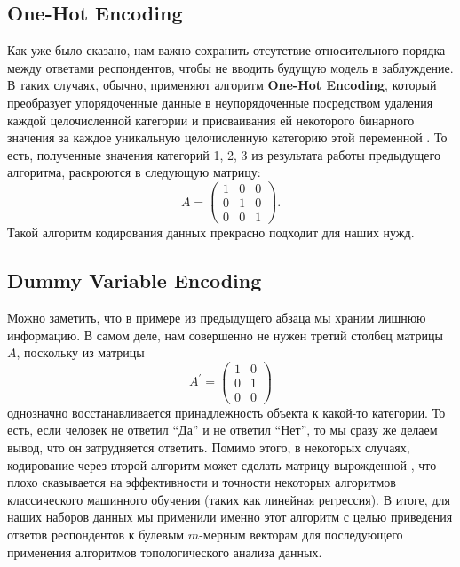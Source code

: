 \subsection{One-Hot Encoding}

Как уже было сказано, нам важно сохранить отсутствие относительного порядка между ответами респондентов, чтобы не вводить будущую модель в заблуждение.
В таких случаях, обычно, применяют алгоритм {\bf One-Hot Encoding}, который преобразует упорядоченные данные в неупорядоченные посредством удаления каждой целочисленной категории и присваивания ей некоторого бинарного значения за каждое уникальную целочисленную категорию этой переменной \cite{feature-eng}.
То есть, полученные значения категорий 1, 2, 3 из результата работы предыдущего алгоритма, раскроются в следующую матрицу:
\[
    A = \begin{pmatrix}
        1 & 0 & 0 \\
        0 & 1 & 0 \\
        0 & 0 & 1
    \end{pmatrix}.
\]
Такой алгоритм кодирования данных прекрасно подходит для наших нужд.

\subsection{Dummy Variable Encoding}

Можно заметить, что в примере из предыдущего абзаца мы храним лишнюю информацию.
В самом деле, нам совершенно не нужен третий столбец матрицы $A$, поскольку из матрицы
\[
    A^{\prime} = \begin{pmatrix}
        1 & 0 \\
        0 & 1 \\
        0 & 0
    \end{pmatrix}
\]
однозначно восстанавливается принадлежность объекта к какой-то категории.
То есть, если человек не ответил \enquote{Да} и не ответил \enquote{Нет}, то мы сразу же делаем вывод, что он затрудняется ответить.
Помимо этого, в некоторых случаях, кодирование через второй алгоритм может сделать матрицу вырожденной \cite{feature-eng-sel}, что плохо сказывается на эффективности и точности некоторых алгоритмов классического машинного обучения (таких как линейная регрессия).
В итоге, для наших наборов данных мы применили именно этот алгоритм с целью приведения ответов респондентов к булевым $m$-мерным векторам для последующего применения алгоритмов топологического анализа данных.